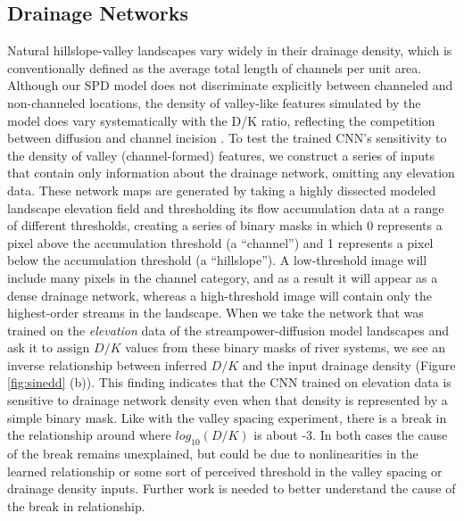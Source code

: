 \documentclass[draft]{agujournal2019}
\begin{document}
\subsection{Drainage Networks}
\label{sec:drainage-density}
Natural hillslope-valley landscapes vary widely in their drainage density, which is conventionally defined as the average total length of channels per unit area.  Although our SPD model does not discriminate explicitly between channeled and non-channeled locations, the density of valley-like features simulated by the model does vary systematically with the D/K ratio, reflecting the competition between diffusion and channel incision \cite{howardBadlandMorphologyEvolution1997, tuckerHillslopeProcessesDrainage1998}.  To test the trained CNN's sensitivity to the density of valley (channel-formed) features, we construct a series of inputs that contain only information about the drainage network, omitting any elevation data.  These network maps are generated by taking a highly dissected modeled landscape elevation field and thresholding its flow accumulation data at a range of different thresholds, creating a series of binary masks in which 0 represents a pixel above the accumulation threshold (a ``channel'') and 1 represents a pixel below the accumulation threshold (a ``hillslope'').
A low-threshold image will include many pixels in the channel category, and as a result it will appear as a dense drainage network, whereas a high-threshold image will contain only the highest-order streams in the landscape.  When we take the network that was trained on the \emph{elevation} data of the streampower-diffusion model landscapes and ask it to assign \(D/K\) values from these binary masks of river systems, we see an inverse relationship between inferred \(D/K\) and the input drainage density (Figure \ref{fig:sinedd} (b)). This finding indicates that the CNN trained on elevation data is sensitive to drainage network density even when that density is represented by a simple binary mask.   Like with the valley spacing experiment, there is a break in the relationship around where \(log_{10}(D/K)\) is about -3.  In both cases the cause of the break remains unexplained, but could be due to nonlinearities in the learned relationship or some sort of perceived threshold in the valley spacing or drainage density inputs.  Further work is needed to better understand the cause of the break in relationship. 
\end{document}
